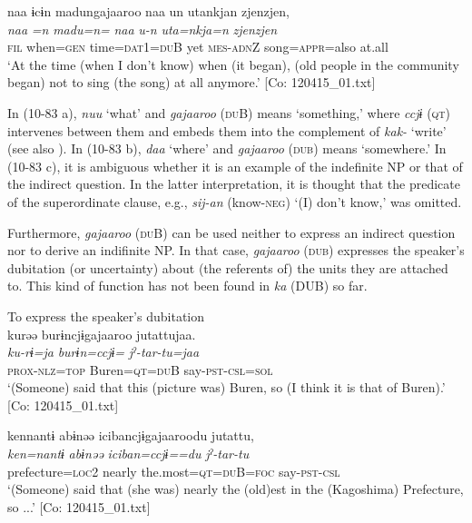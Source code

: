   \ex  %
      \glll    naa  ɨcɨn  madungajaaroo  naa  un  utankjan  {\textbar}zjenzjen{\textbar},\\
      \textit{naa}  \textit{=n}  \textit{madu=n=}  \textit{naa}  \textit{u-n}  \textit{uta=nkja=n} \textit{zjenzjen}\\
      \textsc{fil}  when=\textsc{gen}  time=\textsc{dat}1=\textsc{du}B  yet  \textsc{mes}-\textsc{adn}Z  song=\textsc{appr}=also  at.all\\
      \glt       ‘At the time (when I don’t know) when (it began), (old people in the community began) not to sing (the song) at all anymore.’ [Co: 120415\_01.txt]
    \z
\z

In (10-83 a), \textit{nuu} ‘what’ and \textit{gajaaroo} (\textsc{du}B) means ‘something,’ where \textit{ccjɨ} (\textsc{qt}) intervenes between them and embeds them into the complement of \textit{kak-} ‘write’ (see also ). In (10-83 b), \textit{daa} ‘where’ and \textit{gajaaroo} (\textsc{dub}) means ‘somewhere.’ In (10-83 c), it is ambiguous whether it is an example of the indefinite NP or that of the indirect question. In the latter interpretation, it is thought that the predicate of the superordinate clause, e.g., \textit{sij-an} (know-\textsc{neg}) ‘(I) don’t know,’ was omitted.

Furthermore, \textit{gajaaroo} (\textsc{du}B) can be used neither to express an indirect question nor to derive an indifinite NP. In that case, \textit{gajaaroo} (\textsc{dub}) expresses the speaker’s dubitation (or uncertainty) about (the referents of) the units they are attached to. This kind of function has not been found in \textit{ka} (DUB) so far.

\ea\label{ex:10.84}   To express the speaker’s dubitation\\
  \ea  %
      \glll    kurəə  burɨncjɨgajaaroo  jutattujaa.\\
      \textit{ku-rɨ=ja}  \textit{burɨn=ccjɨ=}  \textit{jˀ-tar-tu=jaa}\\
      \textsc{prox}-\textsc{nlz}=\textsc{top}  Buren=\textsc{qt}=\textsc{du}B  say-\textsc{pst}-\textsc{csl}=\textsc{sol}\\
      \glt       ‘(Someone) said that this (picture was) Buren, so (I think it is that of Buren).’ [Co: 120415\_01.txt]

  \ex  %
      \glll    {\textbar}ken{\textbar}nantɨ  abɨnəə  {\textbar}iciban{\textbar}cjɨgajaaroodu  jutattu,\\
      \textit{ken=nantɨ}  \textit{abɨnəə}  \textit{iciban=ccjɨ==du}  \textit{jˀ-tar-tu}\\
      prefecture=\textsc{loc}2  nearly  the.most=\textsc{qt}=\textsc{du}B=\textsc{foc}  say-\textsc{pst}-\textsc{csl}\\
      \glt       ‘(Someone) said that (she was) nearly the (old)est in the (Kagoshima) Prefecture, so ...’ [Co: 120415\_01.txt]


